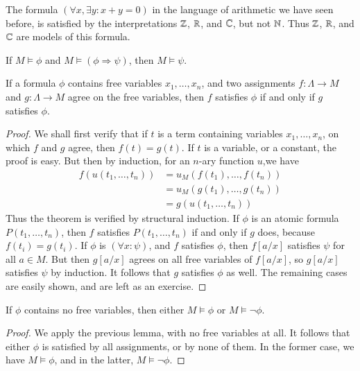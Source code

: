 \begin{example}
    The formula $(\forall x, \exists y: x + y = 0)$ in the language of arithmetic we have seen before, is satisfied by the interpretations $\operatorname{\mathbb{Z}}$, $\operatorname{\mathbb{R}}$, and $\operatorname{\mathbb{C}}$, but not $\operatorname{\mathbb{N}}$. Thus $\operatorname{\mathbb{Z}}$, $\operatorname{\mathbb{R}}$, and $\operatorname{\mathbb{C}}$ are models of this formula.
\end{example}

\begin{lemma} If $M \vDash \phi$ and $M \vDash (\phi \Rightarrow \psi)$, then $M \vDash \psi$. \end{lemma}

\begin{lemma} If a formula $\phi$ contains free variables $x_1, \dots, x_n$, and two assignments $f: \Lambda \to M$ and $g: \Lambda \to M$ agree on the free variables, then $f$ satisfies $\phi$ if and only if $g$ satisfies $\phi$. \end{lemma}
\begin{proof}
    We shall first verify that if $t$ is a term containing variables $x_1, \dots, x_n$, on which $f$ and $g$ agree, then $f(t) = g(t)$. If $t$ is a variable, or a constant, the proof is easy. But then by induction, for an $n$-ary function $u$,we have
    \begin{align*}
        f(u(t_1, \dots, t_n)) &= u_M(f(t_1), \dots, f(t_n))\\
        &= u_M(g(t_1), \dots, g(t_n))\\
        &= g(u(t_1, \dots, t_n))
    \end{align*}
    Thus the theorem is verified by structural induction. If $\phi$ is an atomic formula $P(t_1, \dots, t_n)$, then $f$ satisfies $P(t_1, \dots, t_n)$ if and only if $g$ does, because $f(t_i) = g(t_i)$. If $\phi$ is $(\forall x: \psi)$, and $f$ satisfies $\phi$, then $f[a/x]$ satisfies $\psi$ for all $a \in M$. But then $g[a/x]$ agrees on all free variables of $f[a/x]$, so $g[a/x]$ satisfies $\psi$ by induction. It follows that $g$ satisfies $\phi$ as well. The remaining cases are easily shown, and are left as an exercise.
\end{proof}

\begin{theorem}
    If $\phi$ contains no free variables, then either $M \vDash \phi$ or $M \vDash \neg \phi$.
\end{theorem}
\begin{proof}
    We apply the previous lemma, with no free variables at all. It follows that either $\phi$ is satisfied by all assignments, or by none of them. In the former case, we have $M \vDash \phi$, and in the latter, $M \vDash \neg \phi$.
\end{proof}

